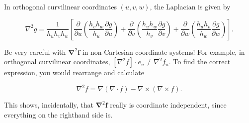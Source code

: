 \begin{proposition}
  In orthogonal curvilinear coordinates \((u, v, w)\), the Laplacian is given by

\[
\nabla^2 g=\frac{1}{h_u h_v h_w}\left[\frac{\partial}{\partial u}\left(\frac{h_v h_w}{h_u} \frac{\partial g}{\partial u}\right)+\frac{\partial}{\partial v}\left(\frac{h_u h_w}{h_v} \frac{\partial g}{\partial v}\right)+\frac{\partial}{\partial w}\left(\frac{h_u h_v}{h_w} \frac{\partial g}{\partial w}\right)\right] .
\]
\end{proposition}

\begin{proofidea}
  
  
\end{proofidea}
  
\begin{formalproof}
  
\end{formalproof}

\begin{remark}
  Be very careful with \(\boldsymbol{\nabla}^2 \boldsymbol{f}\) in non-Cartesian coordinate systems! For example, in orthogonal curvilinear coordinates, \(\left[\nabla^2 f\right] \cdot e_u \neq \nabla^2 f_u\). To find the correct expression, you would rearrange and calculate

\[
\nabla^2 f=\nabla(\nabla \cdot f)-\nabla \times(\nabla \times f) .
\]

This shows, incidentally, that \(\boldsymbol{\nabla}^2 \boldsymbol{f}\) really is coordinate independent, since everything on the righthand side is.
\end{remark}

